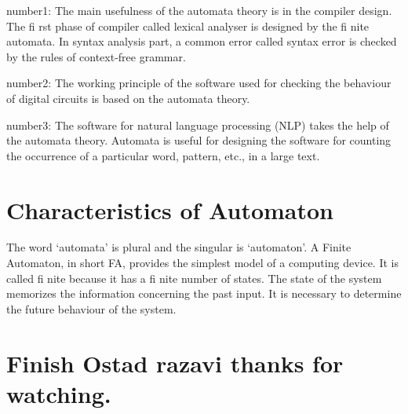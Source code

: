 \documentclass[]{article}
\begin{document}
 
 number1: The main usefulness of the automata theory is in the compiler design. The fi rst phase of compiler
called lexical analyser is designed by the fi nite automata. In syntax analysis part, a common error
called syntax error is checked by the rules of context-free grammar.


number2:
The working principle of the software used for checking the behaviour of digital circuits is based
on the automata theory.


number3:
The software for natural language processing (NLP) takes the help of the automata theory.
 Automata is useful for designing the software for counting the occurrence of a particular word,
pattern, etc., in a large text.
 
\section{Characteristics of Automaton}
The word ‘automata’ is plural and the singular is ‘automaton’. A Finite Automaton, in short FA, provides
the simplest model of a computing device. It is called fi nite because it has a fi nite number of states. The
state of the system memorizes the information concerning the past input. It is necessary to determine
the future behaviour of the system.


\section{Finish Ostad razavi thanks for watching.}


 
\end{document}
